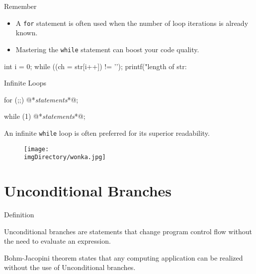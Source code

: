 \documentclass[compress]{beamer}
\begin{document}
\begin{slide}
	\begin{block}{Remember}

	\begin{itemize}
	\item[] A \texttt{for} statement is often used when the number of loop iterations is already known.
	\item[] Mastering the \texttt{while} statement can boost your code quality.
	\end{itemize}

	\begin{terminal}
	int i = 0;
	while ((ch = str[i++]) != '\0');
	printf("length of str: %
	\end{terminal}

	\end{block}
\end{slide}

\begin{slide}
	\begin{block}{Infinite Loops}

	\begin{terminal}
	for (;;) {
	    @*\textit{statements}*@;
	}
	\end{terminal}

	\begin{terminal}
	while (1) {
	    @*\textit{statements}*@;
	}
	\end{terminal}

	An infinite \texttt{while} loop is often preferred for its superior readability.

	\end{block}
\end{slide}

\begin{slide}
	\begin{figure}
	\texttt{[image: \\imgDirectory/wonka.jpg]}
	\end{figure}
\end{slide}

\section{Unconditional Branches}

\begin{slide}
	\begin{block}{Definition}

	Unconditional branches are statements that change program control flow without the need to evaluate an expression.

	Bohm-Jacopini theorem states that any computing application can be realized without the use of Unconditional branches.

	\end{block}
\end{slide}
\end{document}
